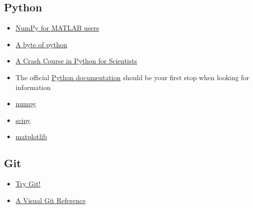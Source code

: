 \documentclass{cmc}
\begin{document}
\subsection{Python}
\label{sec:python_ref}
\begin{itemize}
\item \href{http://mathesaurus.sourceforge.net/matlab-numpy.html}{NumPy for
    MATLAB users}
\item \href{https://python.swaroopch.com}{A byte of python}
\item \href{http://nbviewer.jupyter.org/gist/rpmuller/5920182}{A Crash Course in
    Python for Scientists}
\item The official \href{https://docs.python.org/2/}{Python documentation}
  should be your first stop when looking for information
\item \href{http://numpy.scipy.org/}{numpy}
\item \href{http://www.scipy.org/}{scipy}
\item \href{http://matplotlib.sourceforge.net/}{matplotlib}
\end{itemize}

\subsection{Git}
\label{sec:git_ref}
\begin{itemize}
\item \href{https://try.github.io/levels/1/challenges/1}{Try Git!}
\item \href{https://marklodato.github.io/visual-git-guide/index-en.html}{A
    Visual Git Reference}
\end{itemize}
\end{document}

